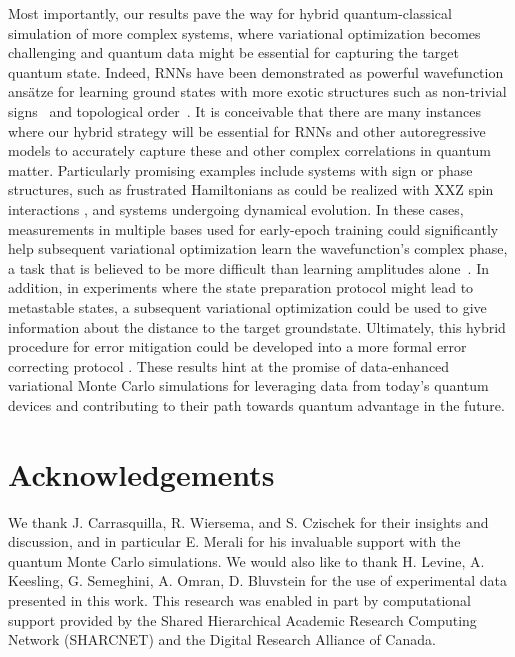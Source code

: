 \documentclass[twocolumn,
                showpacs,
                nofootinbib,
                nobibnotes,
                aps,
                superscriptaddress,
                amssymb,
                amsmath,
                floatfix,
                reprint,
                prx, 
                notitlepage,
                showkeys,
                10pt,
		]{revtex4-2}
\begin{document}
Most importantly, our results pave the way for hybrid quantum-classical simulation of more complex systems, where variational optimization becomes challenging and quantum data might be essential for capturing the target quantum state. 
Indeed, RNNs have been demonstrated as powerful wavefunction ans\"atze for learning ground states with more exotic structures such as non-trivial signs~\cite{hibat2022supplementing} and topological order~\cite{hibat2023investigating}.
It is conceivable that there are many instances where our hybrid strategy will be essential for RNNs and other autoregressive models to accurately capture these and other complex correlations in  quantum matter. 
Particularly promising examples include systems with sign or phase structures, such as frustrated Hamiltonians as could be realized with XXZ spin interactions \cite{XXZ}, and systems undergoing dynamical evolution. In these cases, measurements in multiple bases used for early-epoch training could significantly help subsequent variational optimization learn the wavefunction's complex phase, a task that is believed to be more difficult than learning amplitudes alone~\cite{westerhout2019neural,bukov2021learning}. 
In addition, in experiments where the state preparation protocol might lead to metastable states, a subsequent variational optimization could be used to give information about the distance to the target groundstate. Ultimately, this hybrid procedure for error mitigation could be developed into a more formal error correcting protocol \cite{TorlaiDecoder,Chamberland_2018,bennewitz2022neural}.  These results hint at the promise of data-enhanced variational Monte Carlo simulations for leveraging data from today's quantum devices and contributing to their path towards quantum advantage in the future.




%
\section*{Acknowledgements}
%
We thank J. Carrasquilla, R. Wiersema, and S. Czischek for their insights and discussion, and in particular E. Merali for his invaluable support with the quantum Monte Carlo simulations.
We would also like to thank H. Levine, A. Keesling, G. Semeghini, A. Omran, D. Bluvstein for the use of experimental data presented in this work.
This research was enabled in part by computational support provided by the Shared Hierarchical Academic Research Computing Network (SHARCNET) and the Digital Research Alliance of Canada.
\end{document}
